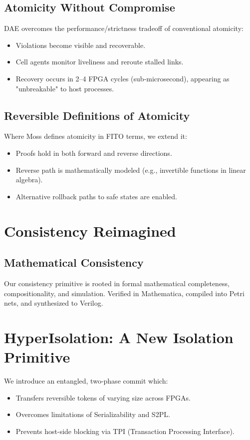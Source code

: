 \documentclass[../../../OAE-SPEC-MAIN.tex]{subfiles}
\begin{document}
\subsection{Atomicity Without Compromise}
DAE overcomes the performance/strictness tradeoff of conventional atomicity:
\begin{itemize}
  \item Violations become visible and recoverable.
  \item Cell agents monitor liveliness and reroute stalled links.
  \item Recovery occurs in 2–4 FPGA cycles (sub-microsecond), appearing as "unbreakable" to host processes.
\end{itemize}

\subsection{Reversible Definitions of Atomicity}
Where Moss defines atomicity in FITO terms, we extend it:
\begin{itemize}
  \item Proofs hold in both forward and reverse directions.
  \item Reverse path is mathematically modeled (e.g., invertible functions in linear algebra).
  \item Alternative rollback paths to safe states are enabled.
\end{itemize}

\section{Consistency Reimagined}

\subsection{Mathematical Consistency}
Our consistency primitive is rooted in formal mathematical completeness, compositionality, and simulation. Verified in Mathematica, compiled into Petri nets, and synthesized to Verilog.

\section{HyperIsolation: A New Isolation Primitive}
We introduce an entangled, two-phase commit which:
\begin{itemize}
  \item Transfers reversible tokens of varying size across FPGAs.
  \item Overcomes limitations of Serializability and S2PL.
  \item Prevents host-side blocking via TPI (Transaction Processing Interface).
\end{itemize}
\end{document}
